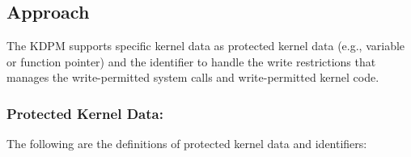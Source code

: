 \subsection{Approach}

The KDPM supports specific kernel data as protected kernel data (e.g., variable
or function pointer) and the identifier to handle the write restrictions that
manages the write-permitted system calls and write-permitted kernel code.
%
%

\subsubsection{Protected Kernel Data:}

The following are the definitions of protected kernel data and identifiers:



